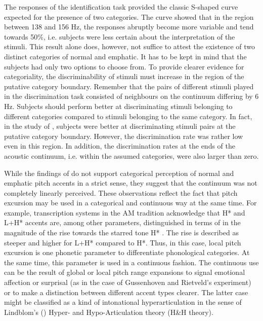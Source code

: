 The responses of the identification task provided the classic S-shaped curve expected for the presence of two categories. The curve showed that in the region between 138 and 156 Hz, the responses abruptly become more variable and tend towards 50\%, i.e. subjects were less certain about the interpretation of the stimuli. This result alone does, however, not suffice to attest the existence of two distinct categories of normal and emphatic. It has to be kept in mind that the subjects had only two options to choose from. To provide clearer evidence for categoriality, the discriminability of stimuli must increase in the region of the putative category boundary. Remember that the pairs of different stimuli played in the discrimination task consisted of neighbours on the continuum differing by 6 Hz. Subjects should perform better at discriminating stimuli belonging to different categories compared to stimuli belonging to the same category. In fact, in the study of \citet{LaddMorton1997}, subjects were better at discriminating stimuli pairs at the putative category boundary. However, the discrimination rate was rather low even in this region. In addition, the discrimination rates at the ends of the acoustic continuum, i.e. within the assumed categories, were also larger than zero.

While the findings of \citet{LaddMorton1997} do not support categorical perception of normal and emphatic pitch accents in a strict sense, they suggest that the continuum was not completely linearly perceived. These observations reflect the fact that pitch excursion may be used in a categorical and continuous way at the same time. For example, transcription systems in the AM tradition acknowledge that H* and L+H* accents are, among other parameters, distinguished in terms of in the magnitude of the rise towards the starred tone H* \citep{GriceBaumann2002}. The rise is described as steeper and higher for L+H* compared to H*. Thus, in this case, local pitch excursion is one phonetic parameter to differentiate phonological categories. At the same time, this parameter is used in a continuous fashion. The continuous use can be the result of global or local pitch range expansions to signal emotional affection or surprisal (as in the case of Gussenhoven and Rietveld's experiment) or to make a distinction between different accent types clearer. The latter case might be classified as a kind of intonational hyperarticulation in the sense of Lindblom's (\citeyear{Lindblom1990}) Hyper- and Hypo-Articulation theory (H\&H theory).

